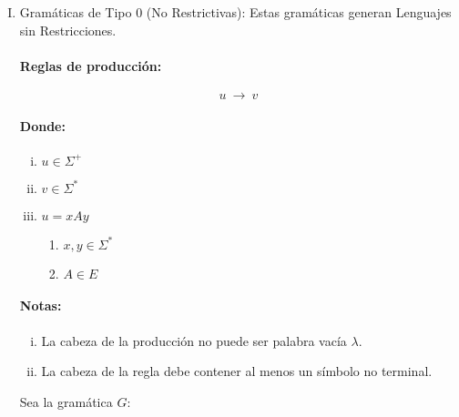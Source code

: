 \begin{enumerate}[I.]

\item Gramáticas de Tipo 0 (No Restrictivas): Estas gramáticas generan Lenguajes sin Restricciones. 
{
\paragraph*{Reglas de producción:}

\begin{equation}
u\ {\longrightarrow}\ v 
\end{equation}

\paragraph*{Donde:}

\begin{enumerate}[i.]

\item $u \in \Sigma^+$ 

\item $v \in \Sigma^*$

\item $u= xAy$

\begin{enumerate}

\item $x,y \in \Sigma^*$

\item $A \in E$

\end{enumerate}

\end{enumerate}

\paragraph*{Notas:}

\begin{enumerate}[i.]

\item La cabeza de la producción no puede ser palabra vacía $\lambda$.

\item La cabeza de la regla debe contener al menos un símbolo no terminal.

\end{enumerate}

\ejem Sea la gramática $G$: \\

}
\end{enumerate}
